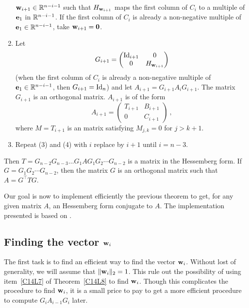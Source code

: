 \begin{algo}
\begin{enumerate}
$\mathbf{w}_{i+1} \in \mathbb{R}^{n-i-1}$ such that $H_{\mathbf{w}_{i+1}}$ maps the first
column of $C_i$ to a multiple of $\mathbf{e}_1$ in $\mathbb{R}^{n-i-1}$.  If the first
column of $C_i$ is already a non-negative multiple of
$\mathbf{e}_1 \in \mathbb{R}^{n-i-1}$, take $\mathbf{w}_{i+1} = \mathbf{0}$.
\item Let
\[
G_{i+1} = \begin{pmatrix}
\operatorname{Id}_{i+1} & 0 \\
0 & H_{\mathbf{w}_{i+1}}
\end{pmatrix}
\]
(when the first column of $C_i$ is already a non-negative
multiple of $\mathbf{e}_1 \in \mathbb{R}^{n-i-1}$, then $G_{i+1} = \operatorname{Id}_n$) and let
$A_{i+1} = G_{i+1} A_i G_{i+1}$.  The matrix $G_{i+1}$ is an orthogonal
matrix.  $A_{i+1}$ is of the form
\[
A_{i+1} =
\begin{pmatrix}
T_{i+1} & B_{i+1} \\
0 & C_{i+1}
\end{pmatrix} \ ,
\]
where $M=T_{i+1}$ is an  matrix satisfying $M_{j,k} = 0$
for $j > k+1$.
\item Repeat (3) and (4) with $i$ replace by $i+1$ until $i=n-3$.
\end{enumerate}
Then $T=G_{n-2} G_{n-3} \ldots G_1 A G_1 G_2 \cdots G_{n-2}$ is a matrix 
in the Hessemberg form.  If $G = G_1 G_2 \cdots G_{n-2}$, then the matrix $G$
is an orthogonal matrix such that $A = G^\top T G$.
\label{C14L10}
\end{algo}

Our goal is now to implement efficiently the previous theorem to get, for any
given matrix $A$, an Hessemberg form conjugate to $A$.  The implementation
presented is based on \cite{BT}.

\subsection{Finding the vector $\mathbf{w}_i$}

The first task is to find an efficient way to find the vector $\mathbf{w}_i$.
Without lost of generality, we will assume that $\|\mathbf{w}_i\|_2 = 1$.
This rule out the possibility of using item~\ref{C14L7} of
Theorem~\ref{C14L8} to find $\mathbf{w}_i$.  Though this complicates
the procedure to find $\mathbf{w}_i$, it is a small price to pay to get a
more efficient procedure to compute $G_i A_{i-1} G_i$ later.

